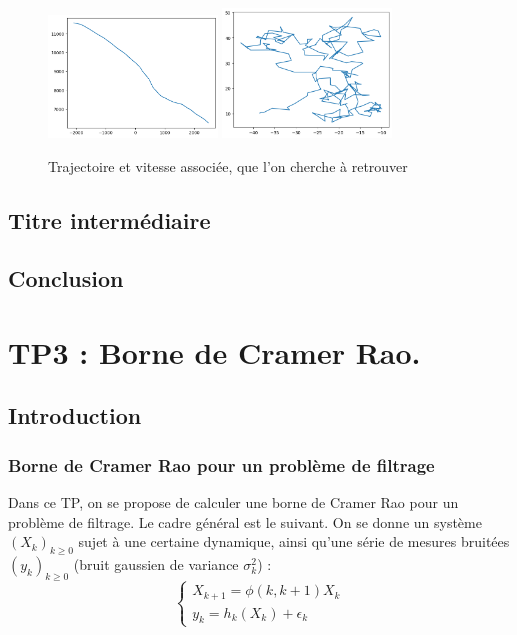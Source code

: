 \documentclass{article}
\begin{document}
\begin{figure}[ht]
\centering
\includegraphics[width=0.4\textwidth]{TP2/position_réelle.png}
\includegraphics[width=0.4\textwidth]{TP2/vitesse_reelle.png}
\caption{Trajectoire et vitesse associée, que l'on cherche à retrouver}
\label{TP2_pos_vit}
\end{figure}

\subsection{Titre intermédiaire}
\subsection{Conclusion}


\newpage

\section{TP3 : Borne de Cramer Rao.}
\subsection{Introduction}
\subsubsection{Borne de Cramer Rao pour un problème de filtrage}

Dans ce TP, on se propose de calculer une borne de Cramer Rao pour un problème de filtrage. Le cadre général est le suivant.
On se donne un système  $(X_{k})_{k\geq 0}$ sujet à une certaine dynamique,
ainsi qu'une série de mesures bruitées $(y_{k})_{k \geq 0}$ (bruit gaussien de variance $\sigma_{k}^{2}$) : 
\[\left\{\begin{array}{ll}
   X_{k+1} = \phi(k,k+1)X_{k} \\
   y_{k}=h_{k}(X_{k})+\epsilon_{k}
\end{array}\right. \]
\end{document}
